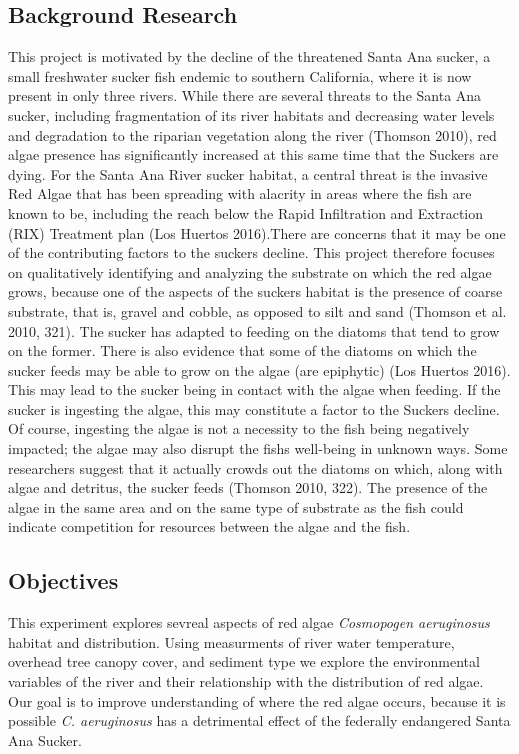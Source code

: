 \documentclass{article}
\begin{document}
\subsection{Background Research} 
This project is motivated by the decline of the threatened Santa Ana sucker, a small freshwater sucker ﬁsh endemic to southern California, where it is now present in only three rivers. While there are several threats to the Santa Ana sucker, including fragmentation of its river habitats and decreasing water levels and degradation to the riparian vegetation along the river (Thomson 2010), red algae presence has significantly increased at this same time that the Suckers are dying. For the Santa Ana River sucker habitat, a central threat is the invasive Red Algae that has been spreading with alacrity in areas where the ﬁsh are known to be, including the reach below the Rapid Inﬁltration and Extraction (RIX) Treatment plan (Los Huertos 2016).There are concerns that it may be one of the contributing factors to the suckers decline. This project therefore focuses on qualitatively identifying and analyzing the substrate on which the red algae grows, because one of the aspects of the suckers habitat is the presence of coarse substrate, that is, gravel and cobble, as opposed to silt and sand (Thomson et al. 2010, 321). The sucker has adapted to feeding on the diatoms that tend to grow on the former. There is also evidence that some of the diatoms on which the sucker feeds may be able to grow on the algae (are epiphytic) (Los Huertos 2016). This may lead to the sucker being in contact with the algae when feeding. If the sucker is ingesting the algae, this may constitute a factor to the Suckers decline. Of course, ingesting the algae is not a necessity to the ﬁsh being negatively impacted; the algae may also disrupt the ﬁshs well-being in unknown ways. Some researchers suggest that it actually crowds out the diatoms on which, along with algae and detritus, the sucker feeds (Thomson 2010, 322). The presence of the algae in the same area and on the same type of substrate as the fish could indicate competition for resources between the algae and the fish. 

\subsection{Objectives}
This experiment explores sevreal aspects of red algae \emph{Cosmopogen aeruginosus} habitat and distribution. Using measurments of river water temperature, overhead tree canopy cover, and sediment type we explore the environmental variables of the river and their relationship with the distribution of red algae.
Our goal is to improve understanding of where the red algae occurs, because it is possible \emph{C. aeruginosus} has a detrimental effect of the federally endangered Santa Ana Sucker.
\end{document}
